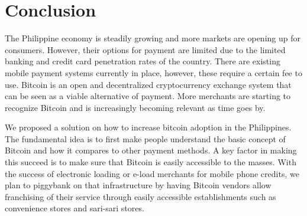 \documentclass{acm_proc_article-sp}
\begin{document}

\section{Conclusion}
The Philippine economy is steadily growing and more markets are opening up for consumers. However, their options for payment are limited due to the limited banking and credit card penetration rates of the country. There are existing mobile payment systems currently in place, however, these require a certain fee to use. Bitcoin is an open and decentralized cryptocurrency exchange system that can be seen as a viable alternative of payment. More merchants are starting to recognize Bitcoin and is increasingly becoming relevant as time goes by.

We proposed a solution on how to increase bitcoin adoption in the Philippines. The fundamental idea is to first make people understand the basic concept of Bitcoin and how it compares to other payment methods. A key factor in making this succeed is to make sure that Bitcoin is easily accessible to the masses. With the success of electronic loading or e-load merchants for mobile phone credits, we plan to piggybank on that infrastructure by having Bitcoin vendors allow franchising of their service through easily accessible establishments such as convenience stores and sari-sari stores.



  
\end{document}
